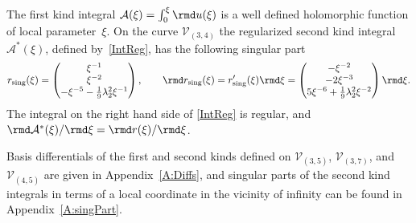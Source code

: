 The first kind integral $\mathcal{A}(\xi)=\int_0^{\xi} \rmd u(\xi)$ is a well defined holomorphic function {of local parameter~$\xi$}. On the curve $\mathcal{V}_{(3,4)}$ the regularized second kind integral $\mathcal{A}^\ast(\xi)$, defined by~\eqref{IntReg}, has the following singular part
\begin{gather*}%
 r_{\textup{sing}} (\xi) =\begin{pmatrix} \xi^{-1} \\ \xi^{-2}\\ - \xi^{-5} - \frac{1}{9}\lambda_2^2 \xi^{-1}\end{pmatrix} ,\qquad
 \rmd r_{\textup{sing}} (\xi) = r'_{\textup{sing}} (\xi) \rmd \xi = \begin{pmatrix} - \xi^{-2} \\ - 2 \xi^{-3}\\
 5 \xi^{-6} + \frac{1}{9} \lambda_2^2 \xi^{-2}\end{pmatrix} \rmd \xi.
\end{gather*}
The integral on the right hand side of \eqref{IntReg} is regular, and $\rmd \mathcal{A}^\ast(\xi)/\rmd \xi = \rmd r(\xi)/\rmd \xi$.

Basis differentials of the first and second kinds defined on $\mathcal{V}_{(3,5)}$, $\mathcal{V}_{(3,7)}$, and $\mathcal{V}_{(4,5)}$ are given in Appendix~\ref{A:Diffs}, and singular parts of the second kind integrals in terms of a local coordinate in the vicinity of infinity can be found in Appendix~\ref{A:singPart}.

